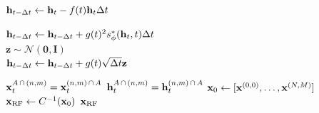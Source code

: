 \begin{algorithm}[tb]
\begin{algorithmic}[1]
            \STATE \;
            \STATE ${\mathbf h}_{t-\Delta t} \gets {\mathbf h}_{t} - f(t){\mathbf h}_{t} \Delta t$
            
            \STATE ${\mathbf h}_{t-\Delta t} \gets {\mathbf h}_{t-\Delta t} + g(t)^2 s_\phi^*({\mathbf h}_{t}, t) \Delta t$\\
            \STATE $\mathbf{z} \sim \mathcal{N}(\mathbf{0}, \mathbf{I})$\\
            \STATE ${\mathbf h}_{t-\Delta t} \gets {\mathbf h}_{t-\Delta t} + g(t) \sqrt{\Delta t} \mathbf{z}$ 
         
            \STATE {}
            \STATE {}
                \STATE ${\mathbf x}_{t}^{A\,\cap\,(n, m)} =  {\mathbf x}_{t}^{(n, m)\,\cap\,A}$
                \STATE ${\mathbf h}_{t}^{A\,\cap\,(n, m)} =  {\mathbf h}_{t}^{(n, m)\,\cap\,A}$
            \ENDFOR 
        \ENDFOR 
    \ENDFOR 
    \STATE ${\mathbf x}_0 \gets [ {\mathbf x}^{(0, 0)}, \dots, {\mathbf x}^{(N, M)} ]$ 
    \STATE ${\mathbf x}_\text{RF} \gets C^{-1}({\mathbf x}_0)$ 
    \OUTPUT ${\mathbf x}_\text{RF}$
\end{algorithmic}
\end{algorithm}